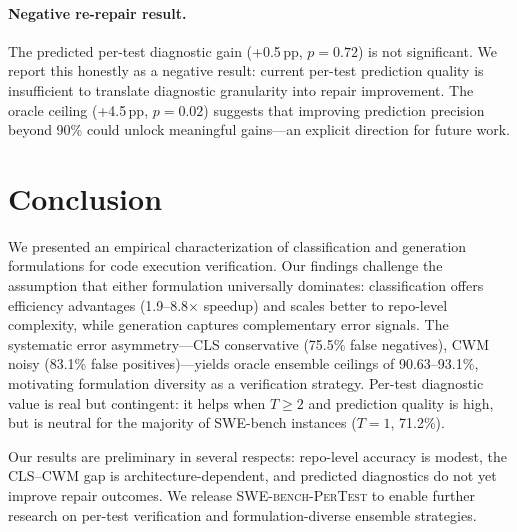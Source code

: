 \documentclass[11pt,a4paper]{article}
\begin{document}
\paragraph{Negative re-repair result.}
The predicted per-test diagnostic gain (+0.5\,pp, $p=0.72$) is not significant.
We report this honestly as a negative result: current per-test prediction quality is insufficient to translate diagnostic granularity into repair improvement.
The oracle ceiling (+4.5\,pp, $p=0.02$) suggests that improving prediction precision beyond 90\% could unlock meaningful gains---an explicit direction for future work.

\section{Conclusion}

We presented an empirical characterization of classification and generation formulations for code execution verification.
Our findings challenge the assumption that either formulation universally dominates: classification offers efficiency advantages (1.9--8.8$\times$ speedup) and scales better to repo-level complexity, while generation captures complementary error signals.
The systematic error asymmetry---CLS conservative (75.5\% false negatives), CWM noisy (83.1\% false positives)---yields oracle ensemble ceilings of 90.63--93.1\%, motivating formulation diversity as a verification strategy.
Per-test diagnostic value is real but contingent: it helps when $T\!\ge\!2$ and prediction quality is high, but is neutral for the majority of SWE-bench instances ($T\!=\!1$, 71.2\%).

Our results are preliminary in several respects: repo-level accuracy is modest, the CLS--CWM gap is architecture-dependent, and predicted diagnostics do not yet improve repair outcomes.
We release \textsc{SWE-bench-PerTest} to enable further research on per-test verification and formulation-diverse ensemble strategies.



\end{document}
